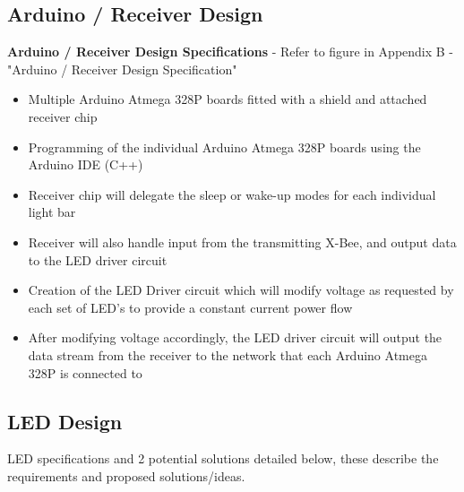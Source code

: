 \documentclass[12pt]{article}
\begin{document}
{		
			\subsection{Arduino / Receiver Design}
				
				\textbf{Arduino / Receiver Design Specifications} - Refer to figure in Appendix B - "Arduino / Receiver Design Specification"
				\begin{itemize}
					\item Multiple Arduino Atmega 328P boards fitted with a shield and attached receiver chip 
					\item Programming of the individual Arduino Atmega 328P boards using the Arduino IDE (C++)
					\item Receiver chip will delegate the sleep or wake-up modes for each individual light bar
					\item Receiver will also handle input from the transmitting X-Bee, and output data to the LED driver circuit
					\item Creation of the LED Driver circuit which will modify voltage as requested by each set of LED’s to provide a constant current power flow
					\item After modifying voltage accordingly, the LED driver circuit will output the data stream from the receiver to the network that each Arduino Atmega 328P is connected to
				\end{itemize}
			
			\subsection{LED Design}
				LED specifications and 2 potential solutions detailed below, these describe the requirements and proposed solutions/ideas.
				
}
\end{document}
